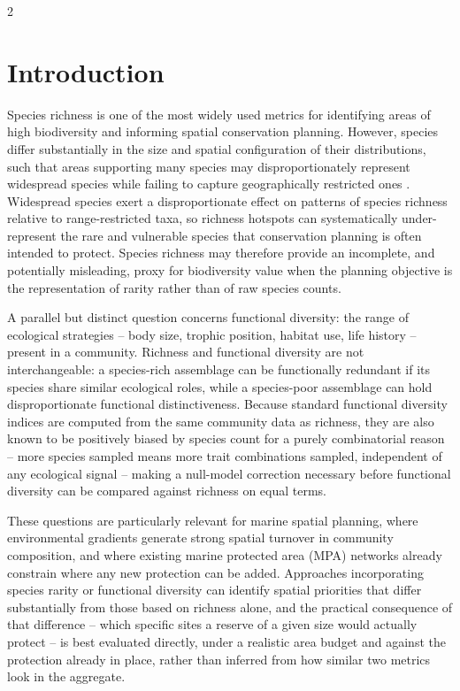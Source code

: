 \begin{spacing}{2}
\section{Introduction}
Species richness is one of the most widely used metrics for identifying areas of high biodiversity and informing spatial conservation planning. However, species differ substantially in the size and spatial configuration of their distributions, such that areas supporting many species may disproportionately represent widespread species while failing to capture geographically restricted ones \citep{CoincidenceRarityRichness,ContributionRarityCommonness}. Widespread species exert a disproportionate effect on patterns of species richness relative to range-restricted taxa, so richness hotspots can systematically under-represent the rare and vulnerable species that conservation planning is often intended to protect. Species richness may therefore provide an incomplete, and potentially misleading, proxy for biodiversity value when the planning objective is the representation of rarity rather than of raw species counts.

A parallel but distinct question concerns functional diversity: the range of ecological strategies -- body size, trophic position, habitat use, life history -- present in a community. Richness and functional diversity are not interchangeable: a species-rich assemblage can be functionally redundant if its species share similar ecological roles, while a species-poor assemblage can hold disproportionate functional distinctiveness. Because standard functional diversity indices are computed from the same community data as richness, they are also known to be positively biased by species count for a purely combinatorial reason -- more species sampled means more trait combinations sampled, independent of any ecological signal -- making a null-model correction necessary before functional diversity can be compared against richness on equal terms.

These questions are particularly relevant for marine spatial planning, where environmental gradients generate strong spatial turnover in community composition, and where existing marine protected area (MPA) networks already constrain where any new protection can be added. Approaches incorporating species rarity or functional diversity can identify spatial priorities that differ substantially from those based on richness alone, and the practical consequence of that difference -- which specific sites a reserve of a given size would actually protect -- is best evaluated directly, under a realistic area budget and against the protection already in place, rather than inferred from how similar two metrics look in the aggregate.


\end{spacing}
